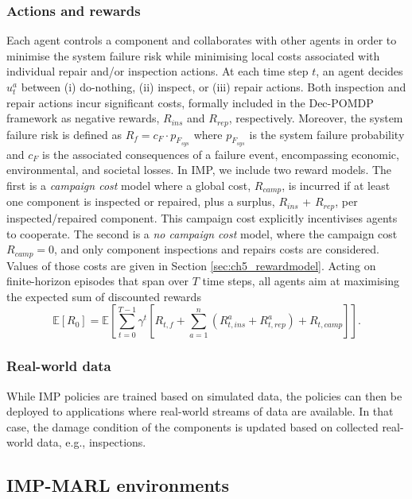 \subsubsection{Actions and rewards}
Each agent controls a component and collaborates with other agents in order to minimise the system failure risk while minimising local costs associated with individual repair and/or inspection actions. 
At each time step $t$, an agent decides $u^a_t$ between (i) do-nothing, (ii) inspect, or (iii) repair actions.
Both inspection and repair actions incur significant costs, formally included in the Dec-POMDP framework as negative rewards, $R_{ins}$ and $R_{rep}$, respectively.
Moreover, the system failure risk is defined as $R_f= c_F \cdot p_{F_{sys}}$ where $p_{F_{sys}}$ is the system failure probability and $c_F$ is the associated consequences of a failure event, encompassing economic, environmental, and societal losses.
In IMP, we include two reward models.
The first is a \emph{campaign cost} model where a global cost, $R_{camp}$, is incurred if at least one component is inspected or repaired, plus a surplus, $R_{ins}$ + $R_{rep}$, per inspected/repaired component.
This campaign cost explicitly incentivises agents to cooperate.
The second is a \emph{no campaign cost} model, where the campaign cost $R_{camp}=0$, and only component inspections and repairs costs are considered. 
Values of those costs are given in Section \ref{sec:ch5_rewardmodel}.
Acting on finite-horizon episodes that span over $T$ time steps, all agents aim at maximising the expected sum of discounted rewards
\begin{equation}
\label{eq:ch5_rewardimpmarl}
    \mathbb{E}[R_{0}] = \mathbb{E} \left[ \sum_{t=0}^{T-1} \gamma^t \left[ R_{t,f}+ \sum_{a=1}^n \left({R_{t,ins}^a} + {R_{t,rep}^a}\right)+R_{t,camp} \right] \right].
\end{equation}

\subsubsection{Real-world data}
While IMP policies are trained based on simulated data, the policies can then be deployed to applications where real-world streams of data are available.
In that case, the damage condition of the components is updated based on collected real-world data, e.g., inspections.
 
\subsection{IMP-MARL environments}
\label{time stepsec:implement_env}

